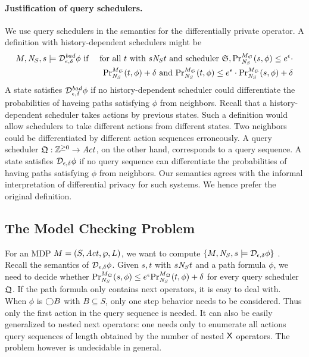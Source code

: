 \noindent
\paragraph{Justification of query schedulers.}
We use query schedulers in the semantics for the differentially
private operator. A definition with history-dependent schedulers
might be
\begin{eqnarray*}
  M, \neighbor{S}, s \models \dpriv{\epsilon}{\delta}^{\mathit{bad}} \phi
  & \textmd{ if } &
  \textmd{for all } t \textmd{ with } s \neighbor{S} t \textmd{ and
  scheduler } \scheduler{S},
  \myPr{s}{M_{\scheduler{S}}}{\neighbor{S}}{\phi} \leq
  e^{\epsilon} \cdot\\
  && \myPr{t}{M_{\scheduler{S}}}{\neighbor{S}}{\phi} + \delta \textmd{ and }
  \myPr{t}{M_{\scheduler{S}}}{\neighbor{S}}{\phi} \leq
  e^{\epsilon} \cdot \myPr{s}{M_{\scheduler{S}}}{\neighbor{S}}{\phi}
  + \delta
\end{eqnarray*}
A state satisfies $\dpriv{\epsilon}{\delta}^{\mathit{bad}} \phi$ if
no history-dependent scheduler could differentiate the probabilities
of haveing paths satisfying
$\phi$ from neighbors. Recall that a history-dependent scheduler takes
actions by previous states. Such a definition would allow
schedulers to take different actions from different states. 
Two neighbors could be differentiated by different action sequences
erroneously.
A query scheduler $\scheduler{Q} : \bbfZ^{\geq 0} \rightarrow \Act$,
on the other hand, corresponds to a query sequence. A state satisfies
$\dpriv{\epsilon}{\delta} \phi$ if no query sequence can differentiate
the probabilities of having paths satisfying $\phi$ from neighbors.
Our semantics agrees with the informal interpretation of differential
privacy for such systems. We hence
prefer the original definition.

\subsection{The Model Checking Problem}
For an MDP $M =
(S, \Act, \wp, L)$, we want to compute $\{ M, \neighbor{S}, s \models
\dpriv{\epsilon}{\delta} \phi \}$ . Recall the semantics of $\dpriv{\epsilon}{\delta}
\phi$. Given $s, t$ with $s \neighbor{S} t$ and a path formula
$\phi$, we need to decide whether
$\myPr{s}{M_{\scheduler{Q}}}{\neighbor{S}}{\phi} \leq
e^{\epsilon} \myPr{t}{M_{\scheduler{Q}}}{\neighbor{S}}{\phi} + \delta$
for every query scheduler $\scheduler{Q}$.
If the path formula only contains next operators, it is easy to deal with. When $\phi$ is $\gX B$ with $B\subseteq S$, only one step behavior needs to be considered. Thus only the first action in the query sequence is needed. It can also be easily generalized to nested next operators:  one needs only to enumerate
all actions query sequences of length obtained by the number of nested $\X$ operators.
The problem however is undecidable in general.


